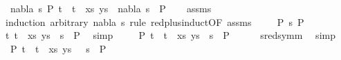 \begin{isabellebody}
\ {\isachardoublequoteopen}{\isasymexists}\ nabla{}\ s{}\ P{}{\isachardot}{\kern0pt}\ {\isacharparenleft}{\kern0pt}{\isacharparenleft}{\kern0pt}t{}\ {\isasymapprox}{\isacharquery}{\kern0pt}\ t{}{\isacharparenright}{\kern0pt}\ {\isacharhash}{\kern0pt}\ xs{\isacharcomma}{\kern0pt}\ ys{\isacharparenright}{\kern0pt}\ {\isasymTurnstile}\ {\isacharparenleft}{\kern0pt}nabla{}{\isacharcomma}{\kern0pt}\ s{}{\isacharparenright}{\kern0pt}\ {\isasymRightarrow}\ P{}{\isachardoublequoteclose}\isanewline
%
\isadelimproof
\ \ %
\endisadelimproof
%
\isatagproof
{}\isamarkupfalse%
\ assms\isanewline
{}\isamarkupfalse%
\ {\isacharparenleft}{\kern0pt}induction\ arbitrary{\isacharcolon}{\kern0pt}\ nabla\ s\ rule{\isacharcolon}{\kern0pt}\ red{\isacharunderscore}{\kern0pt}plus{\isachardot}{\kern0pt}induct{\isacharbrackleft}{\kern0pt}OF\ assms{\isacharparenleft}{\kern0pt}{}{\isacharparenright}{\kern0pt}{\isacharbrackright}{\kern0pt}{\isacharparenright}{\kern0pt}\isanewline
\ \ \isamarkupfalse%
\ {\isacharparenleft}{\kern0pt}{}\ P{}\ s{}\ P{\isacharparenright}{\kern0pt}\isanewline
\ \ \isamarkupfalse%
\ {\isachardoublequoteopen}{\isacharparenleft}{\kern0pt}{\isacharparenleft}{\kern0pt}{\isacharparenleft}{\kern0pt}t{}{\isacharcomma}{\kern0pt}\ t{}{\isacharparenright}{\kern0pt}\ {\isacharhash}{\kern0pt}\ xs{\isacharcomma}{\kern0pt}\ ys{\isacharparenright}{\kern0pt}{\isacharparenright}{\kern0pt}\ {\isasymturnstile}\ s{}\ {\isasymleadsto}\ P{\isachardoublequoteclose}\ \isamarkupfalse%
\ simp\isanewline
\ \ \isamarkupfalse%
\ {\isachardoublequoteopen}{\isasymexists}\ P{}{\isachardot}{\kern0pt}\ {\isacharparenleft}{\kern0pt}{\isacharparenleft}{\kern0pt}t{}\ {\isasymapprox}{\isacharquery}{\kern0pt}\ t{}{\isacharparenright}{\kern0pt}\ {\isacharhash}{\kern0pt}\ xs{\isacharcomma}{\kern0pt}\ ys{\isacharparenright}{\kern0pt}\ {\isasymturnstile}\ s{}\ {\isasymleadsto}\ P{}{\isachardoublequoteclose}\isanewline
\ \ \ \ \isamarkupfalse%
\ sred{\isacharunderscore}{\kern0pt}symm\ \isamarkupfalse%
\ simp\isanewline
\ \ \isamarkupfalse%
\ {\isachardoublequoteopen}{\isasymexists}\ P{}{\isachardot}{\kern0pt}\ {\isacharparenleft}{\kern0pt}{\isacharparenleft}{\kern0pt}t{}\ {\isasymapprox}{\isacharquery}{\kern0pt}\ t{}{\isacharparenright}{\kern0pt}\ {\isacharhash}{\kern0pt}\ xs{\isacharcomma}{\kern0pt}\ ys{\isacharparenright}{\kern0pt}\ {\isasymTurnstile}\ {\isacharparenleft}{\kern0pt}{\isacharbraceleft}{\kern0pt}{\isacharbraceright}{\kern0pt}{\isacharcomma}{\kern0pt}\ s{}{\isacharparenright}{\kern0pt}\ {\isasymRightarrow}\ P{}{\isachardoublequoteclose}\ \isanewline

\end{isabellebody}
